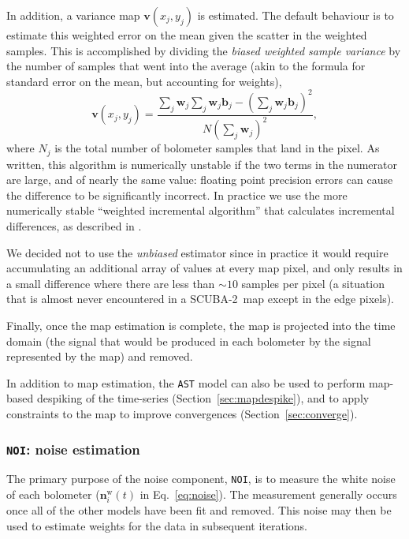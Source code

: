 \documentclass[useAMS,usenatbib,nofootinbib]{mn2e}
\newcommand{\scuba}{SCUBA-2}
\newcommand{\model}[1]{\texttt{#1}}
\begin{document}
In addition, a variance map $\mathbf{v}(x_j,y_j)$ is estimated. The
default behaviour is to estimate this weighted error on the mean given
the scatter in the weighted samples. This is accomplished by dividing
the \emph{biased weighted sample variance} by the number of samples
that went into the average (akin to the formula for standard error on
the mean, but accounting for weights),
%
\begin{equation}
\label{eq:varmap}
\mathbf{v}(x_j,y_j) = \frac{\sum_j \mathbf{w}_j
                            \sum_j \mathbf{w}_j \mathbf{b}_j -
                            \left( \sum_j \mathbf{w}_j \mathbf{b}_j \right)^2 }
                           { N \left( \sum_j \mathbf{w}_j \right)^2 },
\end{equation}
%
where $N_j$ is the total number of bolometer samples that land in the
pixel. As written, this algorithm is numerically unstable if the two
terms in the numerator are large, and of nearly the same value:
floating point precision errors can cause the difference to be
significantly incorrect. In practice we use the more numerically
stable ``weighted incremental algorithm'' that calculates incremental
differences, as described in \citet{west1979}.

 We decided not to use the \emph{unbiased} estimator since in
practice it would require accumulating an additional array of values
at every map pixel, and only results in a small difference where there
are less than $\sim10$ samples per pixel (a situation that is almost
never encountered in a \scuba\ map except in the edge pixels).

Finally, once the map estimation is complete, the map is projected
into the time domain (the signal that would be produced in each
bolometer by the signal represented by the map) and removed.

In addition to map estimation, the \model{AST} model can also be used
to perform map-based despiking of the time-series
(Section~\ref{sec:mapdespike}), and to apply constraints to the map to
improve convergences (Section~\ref{sec:converge}).

\subsubsection{\model{NOI}: noise estimation}
\label{sec:noi}

The primary purpose of the noise component, \model{NOI}, is to measure
the white noise of each bolometer ($\mathbf{n}^\mathrm{w}_i(t)$ in
Eq.~\ref{eq:noise}). The measurement generally occurs once all of the
other models have been fit and removed. This noise may then be used to
estimate weights for the data in subsequent iterations.
\end{document}
